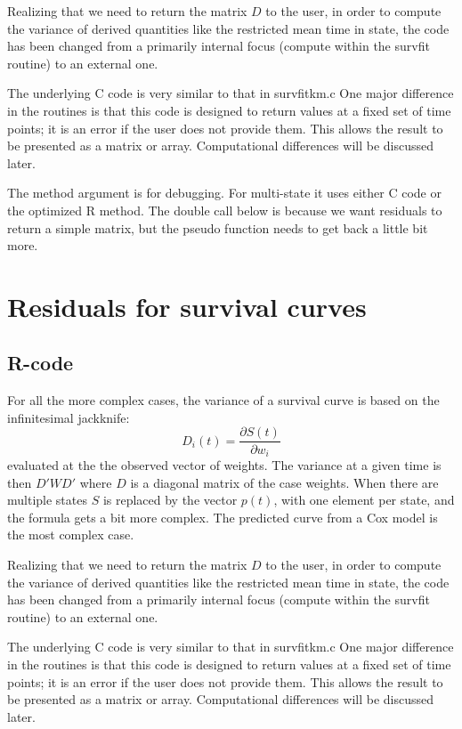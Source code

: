 \documentclass{article}
\begin{document}
Realizing that we need to return the matrix $D$ to the user, in order to compute
the variance of derived quantities like the restricted mean time in state, 
the code has been changed from a primarily internal focus (compute within the
survfit routine) to an external one. 

The underlying C code is very similar to that in survfitkm.c
One major difference in the routines is that this code is designed to return
values at a fixed set of time points; it is an error if the user does not
provide them.  This allows the result to be presented as a matrix or array.
Computational differences will be discussed later.

The method argument is for debugging.  For multi-state it uses either C code
or the optimized R method.
The double call below is because we want residuals to return a simple matrix,
but the pseudo function needs to get back a little bit more.

\section{Residuals for survival curves}
\subsection{R-code}
For all the more complex cases, the variance of a survival curve is based on 
the infinitesimal jackknife:
$$
D_i(t) = \frac{\partial S(t)}{\partial w_i}
$$
evaluated at the the observed vector of weights.  The variance at a given 
time is then  $D'WD'$ where $D$ is a diagonal matrix of the case weights.
When there are multiple states $S$ is replaced by the vector $p(t)$, with
one element per state, and the formula gets a bit more complex.
The predicted curve from a Cox model is the most complex case.

Realizing that we need to return the matrix $D$ to the user, in order to compute
the variance of derived quantities like the restricted mean time in state, 
the code has been changed from a primarily internal focus (compute within the
survfit routine) to an external one. 

The underlying C code is very similar to that in survfitkm.c
One major difference in the routines is that this code is designed to return
values at a fixed set of time points; it is an error if the user does not
provide them.  This allows the result to be presented as a matrix or array.
Computational differences will be discussed later.
\end{document}
